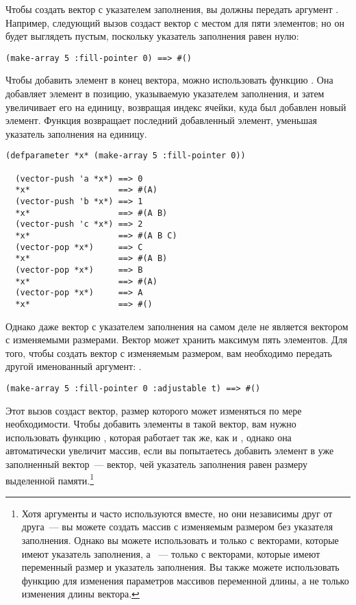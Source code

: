 Чтобы создать вектор с указателем заполнения, вы должны передать 
аргумент .  Например, следующий вызов  создаст вектор
с местом для пяти элементов; но он будет выглядеть пустым, поскольку указатель заполнения
равен нулю:

\begin{lstlisting}[style=lisprepl]
  (make-array 5 :fill-pointer 0) ==> #()
\end{lstlisting}

Чтобы добавить элемент в конец вектора, можно использовать функцию
.  Она добавляет элемент в позицию, указываемую указателем заполнения, и
затем увеличивает его на единицу, возвращая индекс ячейки, куда был добавлен новый
элемент.  Функция  возвращает последний добавленный элемент, уменьшая
указатель заполнения на единицу.

\begin{lstlisting}[style=lisprepl]
  (defparameter *x* (make-array 5 :fill-pointer 0))
  
  (vector-push 'a *x*) ==> 0
  *x*                  ==> #(A)
  (vector-push 'b *x*) ==> 1
  *x*                  ==> #(A B)
  (vector-push 'c *x*) ==> 2
  *x*                  ==> #(A B C)
  (vector-pop *x*)     ==> C
  *x*                  ==> #(A B)
  (vector-pop *x*)     ==> B
  *x*                  ==> #(A)
  (vector-pop *x*)     ==> A
  *x*                  ==> #()
\end{lstlisting}

Однако даже вектор с указателем заполнения на самом деле не является вектором с изменяемыми
размерами.  Вектор  может хранить максимум пять элементов.  Для того, чтобы
создать вектор с изменяемым размером, вам необходимо передать  другой
именованный аргумент: .

\begin{lstlisting}[style=lisprepl]
  (make-array 5 :fill-pointer 0 :adjustable t) ==> #()
\end{lstlisting}

Этот вызов создаст вектор, размер которого может изменяться по мере необходимости.  Чтобы
добавить элементы в такой вектор, вам нужно использовать функцию
, которая работает так же, как и , однако
она автоматически увеличит массив, если вы попытаетесь добавить элемент в
уже заполненный вектор~--- вектор, чей указатель заполнения равен размеру выделенной
памяти.\footnote{Хотя аргументы  и  часто используются
  вместе, но они независимы друг от друга~--- вы можете создать
  массив с изменяемым размером без указателя заполнения.  Однако вы можете использовать
   и  только с векторами, которые имеют указатель
  заполнения, а ~--- только с векторами, которые имеют переменный
  размер и указатель заполнения.  Вы также можете использовать функцию 
  для изменения параметров массивов переменной длины, а не только изменения длины
  вектора.}


